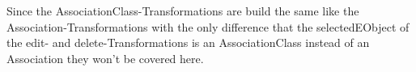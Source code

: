 Since the AssociationClass-Transformations are build the same like the
Association-Transformations with the only difference that the selectedEObject
of the edit- and delete-Transformations is an AssociationClass instead of an
Association they won't be covered here.
